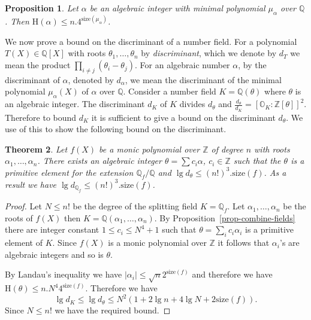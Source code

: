 \documentclass[11pt]{madras}%
\newtheorem{theorem}{Theorem}[chapter]
\newtheorem{proposition}[theorem]{Proposition}
\theoremstyle{remark}
\newcommand{\size}[1]{{\ensuremath{\mathrm{size}\left(#1\right)}}}
\newcommand{\Height}[1]{\ensuremath{\mathrm{H}\left(#1\right)}}
\newcommand{\Int}[1][]{{\ensuremath{\mathbb{O}_{#1}}}}
\begin{document}
\begin{proposition}\label{prop-height-wrt-sizeminpoly}
  Let $\alpha$ be an algebraic integer with minimal polynomial
  $\mu_\alpha$ over $\mathbb{Q}$. Then $\Height{\alpha} \leq
  n.4^{\size{\mu_\alpha}}$.
\end{proposition}


We now prove a bound on the discriminant of a number field. For a
polynomial $T(X) \in \mathbb{Q}[X]$ with roots
$\theta_1,\ldots,\theta_n$ by
\emph{discriminant}, which we
denote by $d_T$ we mean the product $\prod_{i\neq j} (\theta_i -
\theta_j)$. For an algebraic number $\alpha$, by the discriminant of
$\alpha$, denoted by $d_\alpha$, we mean the discriminant of the
minimal polynomial $\mu_\alpha(X)$ of $\alpha$ over $\mathbb{Q}$.
Consider a number field $K = \mathbb{Q}(\theta)$ where $\theta$ is an
algebraic integer. The discriminant $d_K$ of $K$ divides $d_\theta$
and $\frac{d_\theta}{d_K} = [\Int[K]: \mathbb{Z}[\theta]]^2$.
Therefore to bound $d_K$ it is sufficient to give a bound on the
discriminant $d_\theta$.  We use of this to show the following bound
on the discriminant.

\begin{theorem}\label{thm-bound-dtheta}
  Let $f(X)$ be a monic polynomial over $\mathbb{Z}$ of degree $n$
  with roots $\alpha_1,\ldots,\alpha_n$.  There exists an algebraic
  integer $\theta = \sum c_i \alpha$, $c_i \in \mathbb{Z}$ such that
  the $\theta$ is a primitive element for the extension
  $\mathbb{Q}_f/\mathbb{Q}$ and $\lg{d_\theta} \leq (n!)^3.
  \size{f}$.  As a result we have $\lg{d_{\mathbb{Q}_f}} \leq
  (n!)^3.\size{f}$.
\end{theorem}
\begin{proof}
  Let $N \leq n!$ be the degree of the splitting field $K =
  \mathbb{Q}_f$. Let $\alpha_1,\ldots,\alpha_n$ be the roots of $f(X)$
  then $K = \mathbb{Q}(\alpha_1,\ldots,\alpha_n)$. By
  Proposition~\ref{prop-combine-fields} there are integer constant $1
  \leq c_i \leq N^4 +1$ such that $\theta = \sum_i c_i \alpha_i$ is a
  primitive element of $K$. Since $f(X)$ is a monic polynomial over
  $\mathbb{Z}$ it follows that $\alpha_i$'s are algebraic integers and
  so is $\theta$. 

  By Landau's inequality we have $|\alpha_i| \leq \sqrt{n}2^\size{f}$
  and therefore we have $\Height{\theta} \leq n.N^4 4^\size{f}$.
  Therefore we have
  \[
  \lg{d_K} \leq \lg{d_\theta} \leq N^2 (1 + 2\lg{n} + 4\lg{N} +
  2\size{f}).
  \]
  Since $N \leq n!$ we have the required bound.
\end{proof}
\end{document}
